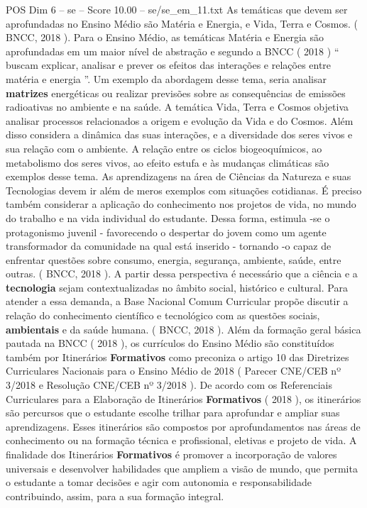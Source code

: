 \begin{textsample}{POS Dim 6 – se – Score 10.00 – se/se\_em\_11.txt}
As temáticas que devem ser aprofundadas no Ensino Médio são Matéria e Energia, e Vida, Terra e Cosmos. ( BNCC, 2018 ).
Para o Ensino Médio, as temáticas Matéria e Energia são aprofundadas em um maior nível de abstração e segundo a BNCC ( 2018 ) “ buscam explicar, analisar e prever os efeitos das interações e relações entre matéria e energia ”.
Um exemplo da abordagem desse tema, seria analisar \textbf{matrizes} energéticas ou realizar previsões sobre as consequências de emissões radioativas no ambiente e na saúde.
A temática Vida, Terra e Cosmos objetiva analisar processos relacionados a origem e evolução da Vida e do Cosmos.
Além disso considera a dinâmica das suas interações, e a diversidade dos seres vivos e sua relação com o ambiente.
A relação entre os ciclos biogeoquímicos, ao metabolismo dos seres vivos, ao efeito estufa e às mudanças climáticas são exemplos desse tema.
As aprendizagens na área de Ciências da Natureza e suas Tecnologias devem ir além de meros exemplos com situações cotidianas.
É preciso também considerar a aplicação do conhecimento nos projetos de vida, no mundo do trabalho e na vida individual do estudante.
Dessa forma, estimula -se o protagonismo juvenil - favorecendo o despertar do jovem como um agente transformador da comunidade na qual está inserido - tornando -o capaz de enfrentar questões sobre consumo, energia, segurança, ambiente, saúde, entre outras. ( BNCC, 2018 ).
A partir dessa perspectiva é necessário que a ciência e a \textbf{tecnologia} sejam contextualizadas no âmbito social, histórico e cultural.
Para atender a essa demanda, a Base Nacional Comum Curricular propõe discutir a relação do conhecimento científico e tecnológico com as questões sociais, \textbf{ambientais} e da saúde humana. ( BNCC, 2018 ).
Além da formação geral básica pautada na BNCC ( 2018 ), os currículos do Ensino Médio são constituídos também por Itinerários \textbf{Formativos} como preconiza o artigo 10 das Diretrizes Curriculares Nacionais para o Ensino Médio de 2018 ( Parecer CNE/CEB nº 3/2018 e Resolução CNE/CEB nº 3/2018 ).
De acordo com os Referenciais Curriculares para a Elaboração de Itinerários \textbf{Formativos} ( 2018 ), os itinerários são percursos que o estudante escolhe trilhar para aprofundar e ampliar suas aprendizagens.
Esses itinerários são compostos por aprofundamentos nas áreas de conhecimento ou na formação técnica e profissional, eletivas e projeto de vida.
A finalidade dos Itinerários \textbf{Formativos} é promover a incorporação de valores universais e desenvolver habilidades que ampliem a visão de mundo, que permita o estudante a tomar decisões e agir com autonomia e responsabilidade contribuindo, assim, para a sua formação integral.

\end{textsample}
